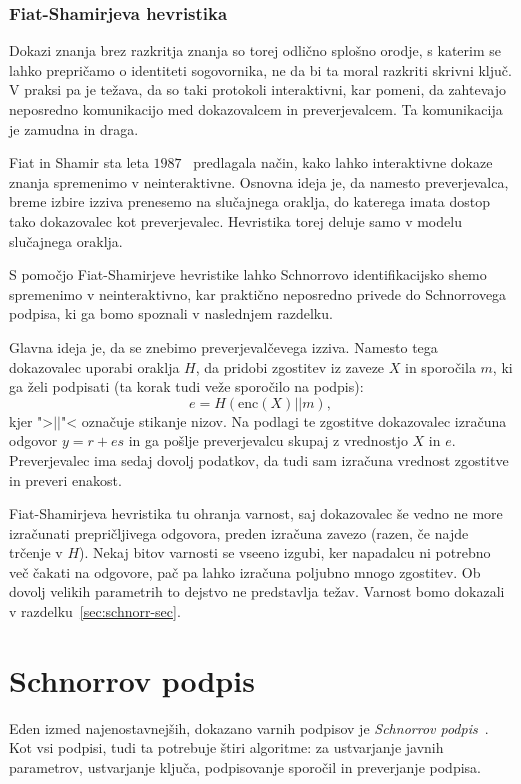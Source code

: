 \documentclass[isrm2, tisk]{fmfdelo}
\begin{document}
\subsubsection{Fiat-Shamirjeva hevristika}
\label{sec:fiat-shamir}
Dokazi znanja brez razkritja znanja so torej odlično splošno orodje, s katerim se lahko prepričamo
o identiteti sogovornika, ne da bi ta moral razkriti skrivni ključ. V praksi pa je težava, da so
taki protokoli interaktivni, kar pomeni, da zahtevajo neposredno komunikacijo med dokazovalcem in
preverjevalcem. Ta komunikacija je zamudna in draga.

Fiat in Shamir sta leta $1987$~\cite{fiat1987heuristic} predlagala način, kako lahko interaktivne
dokaze znanja spremenimo v neinteraktivne. Osnovna ideja je, da namesto preverjevalca, breme izbire
izziva prenesemo na slučajnega oraklja, do katerega imata dostop tako dokazovalec kot preverjevalec.
Hevristika torej deluje samo v modelu slučajnega oraklja.

\begin{primer}
\label{primer:fiat-shamir}
    S pomočjo Fiat-Shamirjeve hevristike lahko Schnorrovo identifikacijsko shemo spremenimo v
    neinteraktivno, kar praktično neposredno privede do Schnorrovega podpisa, ki ga bomo spoznali
    v naslednjem razdelku.

    Glavna ideja je, da se znebimo preverjevalčevega izziva. Namesto tega dokazovalec uporabi
    oraklja $H$, da pridobi zgostitev iz zaveze $X$ in sporočila $m$, ki ga želi podpisati (ta
    korak tudi veže sporočilo na podpis):
    $$
    e = H(\text{enc}(X) || m),
    $$
    kjer ">$||$"< označuje stikanje nizov. Na podlagi te zgostitve dokazovalec izračuna odgovor
    $y = r + es$ in ga pošlje preverjevalcu skupaj z vrednostjo $X$ in $e$. Preverjevalec ima sedaj
    dovolj podatkov, da tudi sam izračuna vrednost zgostitve in preveri enakost.

    Fiat-Shamirjeva hevristika tu ohranja varnost, saj dokazovalec še vedno ne more izračunati
    prepričljivega odgovora, preden izračuna zavezo (razen, če najde trčenje v $H$). Nekaj bitov
    varnosti se vseeno izgubi, ker napadalcu ni potrebno več čakati na odgovore, pač pa lahko izračuna
    poljubno mnogo zgostitev. Ob dovolj velikih parametrih to dejstvo ne predstavlja težav. Varnost bomo
    dokazali v razdelku~\ref{sec:schnorr-sec}.
\end{primer}

\section{Schnorrov podpis}
\label{sec:schnorr}
Eden izmed najenostavnejših, dokazano varnih podpisov je \textit{Schnorrov podpis}~\cite{schnorr1989sig}.
Kot vsi podpisi, tudi ta potrebuje štiri algoritme: za ustvarjanje javnih parametrov, ustvarjanje ključa, 
podpisovanje sporočil in preverjanje podpisa.
\end{document}
